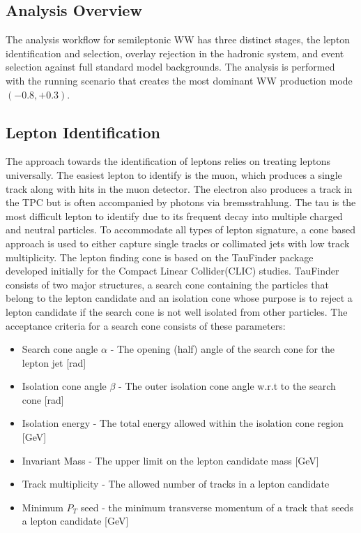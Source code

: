 \subsection{Analysis Overview}
\label{subsec:ana_overview}

The analysis workflow for semileptonic WW has three distinct stages, the lepton identification and selection, overlay rejection in the hadronic system, and event selection against full standard model backgrounds. The analysis is performed with the  running scenario that creates the most dominant WW production mode $(-0.8,+0.3)$. 


\subsection{Lepton Identification}
\label{subsec:Lepton_ID}
The approach towards the identification of leptons relies on treating leptons universally. The easiest lepton to identify is the muon, which produces a single track along with hits in the muon detector. The electron also produces a track in the TPC but is often accompanied by photons via bremsstrahlung. The tau is the most difficult lepton to identify due to its frequent decay into multiple charged and neutral particles. To accommodate all types of lepton signature, a cone based approach is used to either capture single tracks or collimated jets with low track multiplicity. The lepton finding cone is based on the TauFinder package \cite{taufinder} developed initially for the Compact Linear Collider(CLIC) studies. TauFinder consists of two major structures, a search cone containing the particles that belong to the lepton candidate and an isolation cone whose purpose is to reject a lepton candidate if the search cone is not well isolated from other particles. The acceptance criteria for a search cone consists of these parameters:
\begin{itemize}
\item Search cone angle $\alpha$ - The opening (half) angle of the search cone for the lepton jet [rad]
\item Isolation cone angle $\beta$ - The outer isolation cone angle w.r.t to the search cone [rad]
\item Isolation energy - The total energy allowed within the isolation cone region [GeV]
\item Invariant Mass - The upper limit on the lepton candidate mass [GeV]
\item Track multiplicity - The allowed number of tracks in a lepton candidate
\item Minimum $P_T$ seed - the minimum transverse momentum of a track that seeds a lepton candidate [GeV] 
\end{itemize}

